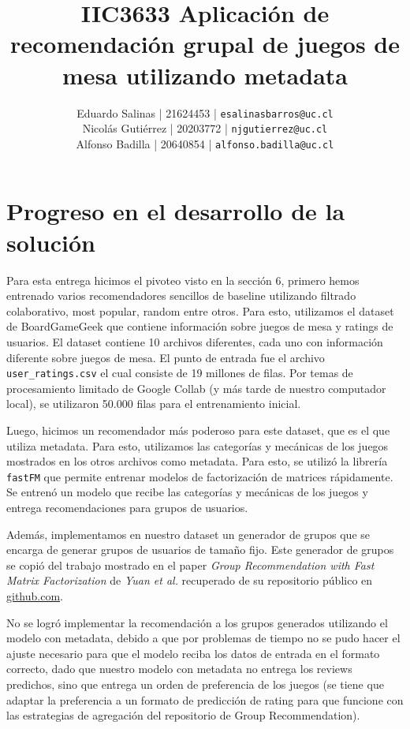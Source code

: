 \documentclass[11pt]{article}
\title{IIC3633 Aplicación de recomendación grupal de juegos de mesa utilizando metadata}
\author{\normalfont 
Eduardo Salinas | 21624453 | \texttt{esalinasbarros@uc.cl} \\
Nicolás Gutiérrez | 20203772 | \texttt{njgutierrez@uc.cl} \\
Alfonso Badilla | 20640854 | \texttt{alfonso.badilla@uc.cl} \\
}
\begin{document}
\maketitle
\newpage

\section{Progreso en el desarrollo de la solución}

Para esta entrega hicimos el pivoteo visto en la sección 6, primero hemos entrenado varios recomendadores sencillos de baseline utilizando filtrado colaborativo, most popular, random entre otros. Para esto, utilizamos el dataset de BoardGameGeek que contiene información sobre juegos de mesa y ratings de usuarios. El dataset contiene 10 archivos diferentes, cada uno con información diferente sobre juegos de mesa. El punto de entrada fue el archivo \texttt{user\_ratings.csv} el cual consiste de 19 millones de filas. Por temas de procesamiento limitado de Google Collab (y más tarde de nuestro computador local), se utilizaron 50.000 filas para el entrenamiento inicial.

Luego, hicimos un recomendador más poderoso para este dataset, que es el que utiliza metadata. Para esto, utilizamos las categorías y mecánicas de los juegos mostrados en los otros archivos como metadata. Para esto, se utilizó la librería \texttt{fastFM} que permite entrenar modelos de factorización de matrices rápidamente. Se entrenó un modelo que recibe las categorías y mecánicas de los juegos y entrega recomendaciones para grupos de usuarios.

Además, implementamos en nuestro dataset un generador de grupos que se encarga de generar grupos de usuarios de tamaño fijo. Este generador de grupos se copió del trabajo mostrado en el paper \textit{Group Recommendation with Fast Matrix Factorization} de \textit{Yuan et al.} recuperado de su repositorio público en \href{https://github.com/barnap/group-recommenders-offline-evaluation}{github.com}.

No se logró implementar la recomendación a los grupos generados utilizando el modelo con metadata, debido a que por problemas de tiempo no se pudo hacer el ajuste necesario para que el modelo reciba los datos de entrada en el formato correcto, dado que nuestro modelo con metadata no entrega los reviews predichos, sino que entrega un orden de preferencia de los juegos (se tiene que adaptar la preferencia a un formato de predicción de rating para que funcione con las estrategias de agregación del repositorio de Group Recommendation).
\end{document}
